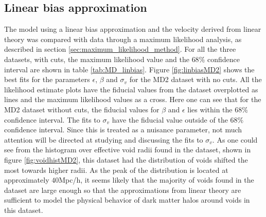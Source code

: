 \subsection{Linear bias approximation}
The model using a linear bias approximation and the velocity derived from linear theory was compared with data through a maximum likelihood analysis, as described in section \ref{sec:maximum_likelihood_method}. For all the three datasets, with cuts, the maximum likelihood value and the $68\%$ confidence interval are shown in table \ref{tab:MD_linbias}. Figure \ref{fig:linbiasMD2} shows the best fits for the parameters $\epsilon$, $\beta$ and $\sigma_v$ for the MD2 dataset with no cuts. All the likelihood estimate plots have the fiducial values from the dataset overplotted as lines and the maximum likelihood values as a cross. Here one can see that for the MD2 dataset without cuts, the fiducial values for $\beta$ and $\epsilon$ lies within the $68\%$ confidence interval. The fits to $\sigma_v$ have the fiducial value outside of the $68\%$ confidence interval. Since this is treated as a nuisance parameter, not much attention will be directed at studying and discussing the fits to $\sigma_v$. As one could see from the histogram over effective void radii found in the dataset, shown in figure \ref{fig:voidhistMD2}, this dataset had the distribution of voids shifted the most towards higher radii. As the peak of the distribution is located at approximately $40$Mpc/h, it seems likely that the majority of voids found in the dataset are large enough so that the approximations from linear theory are sufficient to model the physical behavior of dark matter halos around voids in this dataset.\\\indent
